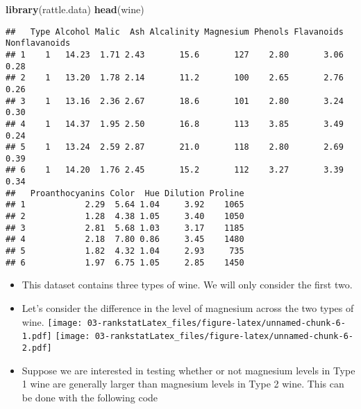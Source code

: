 \documentclass[]{book}
\newenvironment{Shaded}{\begin{snugshade}}{\end{snugshade}}
\newcommand{\DecValTok}[1]{\textcolor[rgb]{0.00,0.00,0.81}{#1}}
\newcommand{\KeywordTok}[1]{\textcolor[rgb]{0.13,0.29,0.53}{\textbf{#1}}}
\newcommand{\NormalTok}[1]{#1}
\newcommand{\OperatorTok}[1]{\textcolor[rgb]{0.81,0.36,0.00}{\textbf{#1}}}
\newcommand{\StringTok}[1]{\textcolor[rgb]{0.31,0.60,0.02}{#1}}
\providecommand{\tightlist}{%
  \setlength{\itemsep}{0pt}\setlength{\parskip}{0pt}}
\begin{document}
\begin{Shaded}
\begin{Highlighting}[]
\KeywordTok{library}\NormalTok{(rattle.data)}
\KeywordTok{head}\NormalTok{(wine)}
\end{Highlighting}
\end{Shaded}

\begin{verbatim}
##   Type Alcohol Malic  Ash Alcalinity Magnesium Phenols Flavanoids Nonflavanoids
## 1    1   14.23  1.71 2.43       15.6       127    2.80       3.06          0.28
## 2    1   13.20  1.78 2.14       11.2       100    2.65       2.76          0.26
## 3    1   13.16  2.36 2.67       18.6       101    2.80       3.24          0.30
## 4    1   14.37  1.95 2.50       16.8       113    3.85       3.49          0.24
## 5    1   13.24  2.59 2.87       21.0       118    2.80       2.69          0.39
## 6    1   14.20  1.76 2.45       15.2       112    3.27       3.39          0.34
##   Proanthocyanins Color  Hue Dilution Proline
## 1            2.29  5.64 1.04     3.92    1065
## 2            1.28  4.38 1.05     3.40    1050
## 3            2.81  5.68 1.03     3.17    1185
## 4            2.18  7.80 0.86     3.45    1480
## 5            1.82  4.32 1.04     2.93     735
## 6            1.97  6.75 1.05     2.85    1450
\end{verbatim}

\begin{itemize}
\tightlist
\item
  This dataset contains three types of wine. We will only consider the first two.
\end{itemize}

\begin{Shaded}
\end{Shaded}

\begin{itemize}
\item
  Let's consider the difference in the level of magnesium across the two types of wine.
  \texttt{[image: 03-rankstatLatex\_files/figure-latex/unnamed-chunk-6-1.pdf]} \texttt{[image: 03-rankstatLatex\_files/figure-latex/unnamed-chunk-6-2.pdf]}
\item
  Suppose we are interested in testing whether or not magnesium levels in
  Type 1 wine are generally larger than magnesium levels in Type 2 wine.
  This can be done with the following code
\end{itemize}
\end{document}
